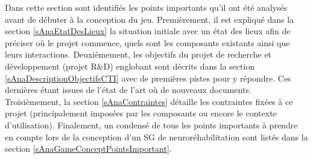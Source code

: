 Dans cette section sont identifiés les points importants qu'il ont été analysés avant de débuter à la conception du jeu. Premièrement, il est expliqué dans la section \ref{sAnaEtatDesLieux} la situation initiale avec un état des lieux afin de préciser où le projet commence, quels sont les composants existants ainsi que leurs interactions. Deuxièmement, les objectifs du projet de recherche et développement (projet R\&D) englobant sont décrits dans la section \ref{sAnaDescriptionObjectifsCTI} avec de premières pistes pour y répondre. Ces dernières étant issues de l'état de l'art où de nouveaux documents. Troisièmement, la section \ref{sAnaContraintes} détaille les contraintes fixées à ce projet (principalement imposées par les composants ou encore le contexte d'utilisation). Finalement, un condensé de tous les points importants à prendre en compte lors de la conception d'un SG de neuroréhabilitation sont listés dans la section \ref{sAnaGameConceptPointsImportant}.
